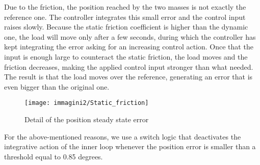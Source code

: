 Due to the friction, the position reached by the two masses is not exactly the reference one. 
The controller integrates this small error and the control input raises slowly. Because the static friction coefficient is higher than the dynamic one, the load will move only after a few seconds, during which the controller has kept integrating the error asking for an increasing control action. \newline Once that the input is enough large to counteract the static friction, the load moves and the friction decreases, making the applied control input stronger than what needed. The result is that the load moves over the reference, generating an error that is even bigger than the original one.

\begin{figure}[h]
	\centering
	\texttt{[image: immagini2/Static\_friction]}
	\caption{Detail of the position steady state error}
\end{figure}

\par For the above-mentioned reasons, we use a switch logic that deactivates the integrative action of the inner loop whenever the position error is smaller than a threshold equal to 0.85 degrees.







